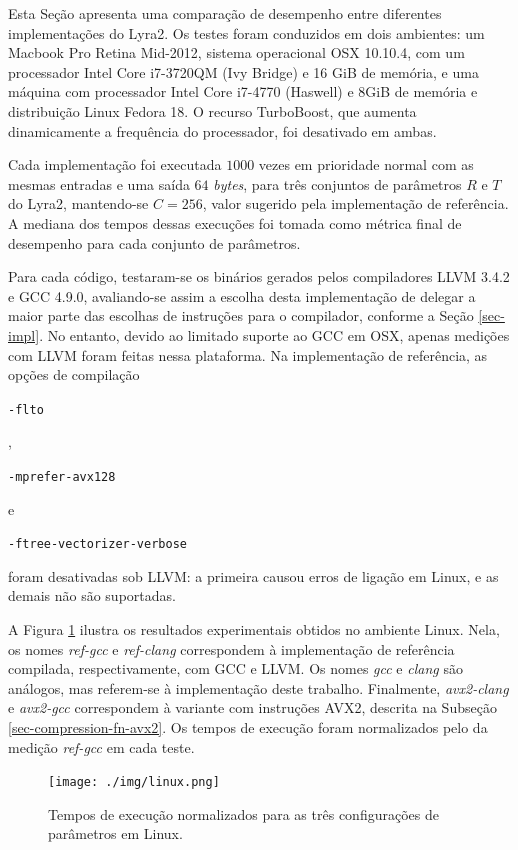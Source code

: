 \documentclass{article}
\begin{document}
Esta Seção apresenta uma comparação de desempenho entre diferentes
implementações do Lyra2. Os testes foram conduzidos em dois ambientes: um
Macbook Pro Retina Mid-2012, sistema operacional OSX 10.10.4, com um
processador Intel Core i7-3720QM (Ivy Bridge) e 16 GiB de memória, e uma
máquina com processador Intel Core i7-4770 (Haswell) e 8GiB de memória e
distribuição Linux Fedora 18. O recurso TurboBoost, que aumenta dinamicamente a
frequência do processador, foi desativado em ambas.

Cada implementação foi executada $1000$ vezes em prioridade normal com as
mesmas entradas e uma saída $64$ \emph{bytes}, para três conjuntos de parâmetros $R$ e
$T$ do Lyra2, mantendo-se $C = 256$, valor sugerido pela implementação de
referência. A mediana dos tempos dessas execuções foi tomada como métrica final
de desempenho para cada conjunto de parâmetros.

Para cada código, testaram-se os binários gerados pelos compiladores LLVM 3.4.2
e GCC 4.9.0, avaliando-se assim a escolha desta implementação de delegar a maior parte
das escolhas de instruções para o compilador, conforme a Seção \ref{sec-impl}.
No entanto, devido ao limitado suporte ao GCC em OSX, apenas medições com LLVM
foram feitas nessa plataforma. Na implementação de referência, as opções de
compilação \begin{small}\verb|-flto|\end{small},
\begin{small}\verb|-mprefer-avx128|\end{small} e
\begin{small}\verb|-ftree-vectorizer-verbose|\end{small} foram desativadas sob
LLVM: a primeira causou erros de ligação em Linux, e as demais não são
suportadas.

A Figura \ref{results-linux} ilustra os resultados experimentais obtidos no
ambiente Linux. Nela, os nomes \emph{ref-gcc} e \emph{ref-clang} correspondem à
implementação de referência compilada, respectivamente, com GCC e LLVM. Os
nomes \emph{gcc} e \emph{clang} são análogos, mas referem-se à implementação
deste trabalho. Finalmente, \emph{avx2-clang} e \emph{avx2-gcc} correspondem à
variante com instruções AVX2, descrita na Subseção
\ref{sec-compression-fn-avx2}. Os tempos de execução foram normalizados pelo da
medição \emph{ref-gcc} em cada teste.

\begin{figure}[htbp]
\centering
\texttt{[image: ./img/linux.png]}
\caption{Tempos de execução normalizados para as três configurações de parâmetros em Linux\label{results-linux}.}
\end{figure}
\end{document}
